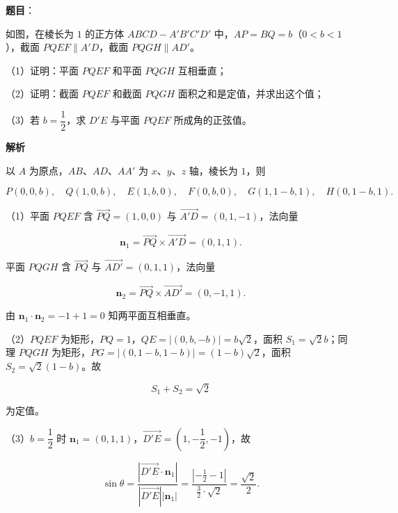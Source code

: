 \begin{answer}

\textbf{题目}：

如图，在棱长为 $1$ 的正方体 $ABCD-A'B'C'D'$ 中，$AP=BQ=b$（$0<b<1$），截面 $PQEF\parallel A'D$，截面 $PQGH\parallel AD'$。

（1）证明：平面 $PQEF$ 和平面 $PQGH$ 互相垂直；

（2）证明：截面 $PQEF$ 和截面 $PQGH$ 面积之和是定值，并求出这个值；

（3）若 $b=\dfrac12$，求 $D'E$ 与平面 $PQEF$ 所成角的正弦值。
\nopagebreak[4]
\begin{center}\end{center}
\nopagebreak[4]
\textbf{解析}

以 $A$ 为原点，$AB$、$AD$、$AA'$ 为 $x$、$y$、$z$ 轴，棱长为 $1$，则

\nopagebreak[4]
\[P(0,0,b),\quad Q(1,0,b),\quad E(1,b,0),\quad F(0,b,0),\quad G(1,1-b,1),\quad H(0,1-b,1).\]

（1）平面 $PQEF$ 含 $\overrightarrow{PQ}=(1,0,0)$ 与 $\overrightarrow{A'D}=(0,1,-1)$，法向量

\nopagebreak[4]
\[\boldsymbol n_1=\overrightarrow{PQ}\times\overrightarrow{A'D}=(0,1,1).\]

平面 $PQGH$ 含 $\overrightarrow{PQ}$ 与 $\overrightarrow{AD'}=(0,1,1)$，法向量

\nopagebreak[4]
\[\boldsymbol n_2=\overrightarrow{PQ}\times\overrightarrow{AD'}=(0,-1,1).\]

由 $\boldsymbol n_1\cdot\boldsymbol n_2=-1+1=0$ 知两平面互相垂直。

（2）$PQEF$ 为矩形，$PQ=1$，$QE=\left|(0,b,-b)\right|=b\sqrt2$，面积 $S_1=\sqrt2b$；同理 $PQGH$ 为矩形，$PG=\left|(0,1-b,1-b)\right|=(1-b)\sqrt2$，面积 $S_2=\sqrt2(1-b)$。故

\nopagebreak[4]
\[S_1+S_2=\sqrt2\]

为定值。

（3）$b=\dfrac12$ 时 $\boldsymbol n_1=(0,1,1)$，$\overrightarrow{D'E}=\left(1,-\dfrac12,-1\right)$，故

\nopagebreak[4]
\[\sin\theta=\frac{\left|\overrightarrow{D'E}\cdot\boldsymbol n_1\right|}{\left|\overrightarrow{D'E}\right|\left|\boldsymbol n_1\right|}=\frac{\left|-\frac12-1\right|}{\frac32\cdot\sqrt2}=\frac{\sqrt2}{2}.\]


\end{answer}
